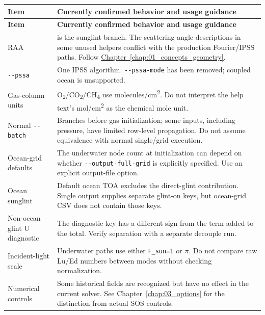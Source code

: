 {\TableFont
\begin{longtable}{@{}>{\raggedright\arraybackslash}p{}>{\raggedright\arraybackslash}p{}@{}}
\toprule
\textbf{Item} & \textbf{Currently confirmed behavior and usage guidance} \\
\midrule
\endfirsthead
\toprule
\textbf{Item} & \textbf{Currently confirmed behavior and usage guidance} \\
\midrule
\endhead
\bottomrule
\endfoot
RAA & 180\textdegree{} is the sunglint branch. The scattering-angle descriptions in some unused helpers conflict with the production Fourier/IPSS paths. Follow \hyperref[chap:01_concepts_geometry]{Chapter~\ref*{chap:01_concepts_geometry}}. \\
\texttt{-\allowbreak{}-\allowbreak{}pssa} & One IPSS algorithm. \texttt{-\allowbreak{}-\allowbreak{}pssa-\allowbreak{}mode} has been removed; coupled ocean is unsupported. \\
Gas-column units & O\textsubscript{2}/CO\textsubscript{2}/CH\textsubscript{4} use molecules/cm\textsuperscript{2}. Do not interpret the help text's mol/cm\textsuperscript{2} as the chemical mole unit. \\
Normal \texttt{-\allowbreak{}-\allowbreak{}batch} & Branches before gas initialization; some inputs, including pressure, have limited row-level propagation. Do not assume equivalence with normal single/grid execution. \\
Ocean-grid defaults & The underwater node count at initialization can depend on whether \texttt{-\allowbreak{}-\allowbreak{}output-\allowbreak{}full-\allowbreak{}grid} is explicitly specified. Use an explicit output-file option. \\
Ocean sunglint & Default ocean TOA excludes the direct-glint contribution. Single output supplies separate glint-on keys, but ocean-grid CSV does not contain those keys. \\
Non-ocean glint U diagnostic & The diagnostic key has a different sign from the term added to the total. Verify separation with a separate decouple run. \\
Incident-light scale & Underwater paths use either \texttt{F\_\allowbreak{}sun=\allowbreak{}1} or \ensuremath{\pi}. Do not compare raw Lu/Ed numbers between modes without checking normalization. \\
Numerical controls & Some historical fields are recognized but have no effect in the current solver. See Chapter~\ref{chap:03_options} for the distinction from actual SOS controls. \\

\end{longtable}}
